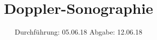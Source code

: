 
\setlength{\parindent}{0em}

\subject{US3}
\title{Doppler-Sonographie}
\date{%
  Durchführung: 05.06.18
  \hspace{3em}
  Abgabe: 12.06.18
}



\maketitle
\thispagestyle{empty}
\tableofcontents
\newpage







\printbibliography{}


